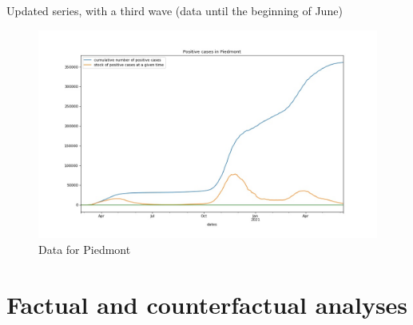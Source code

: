 \documentclass[9pt]{beamer}
\begin{document}
\begin{frame}{Updated series, with a third wave (data until the beginning of June)}

\begin{figure}[H]
\center
\includegraphics[scale=0.35]{andamento_iGSS.jpg}
\caption{Data for Piedmont} 
\label{dataP}
\end{figure}


\end{frame}




\section{Factual and counterfactual analyses}
\end{document}
